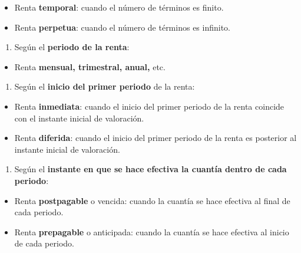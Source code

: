 \documentclass[
  letterpaper,
  DIV=11,
  numbers=noendperiod]{scrartcl}
\providecommand{\tightlist}{%
  \setlength{\itemsep}{0pt}\setlength{\parskip}{0pt}}\usepackage{longtable,booktabs,array}
\begin{document}
\begin{itemize}
\tightlist
\item
  Renta \textbf{temporal}: cuando el número de términos es finito.
\item
  Renta \textbf{perpetua}: cuando el número de términos es infinito.
\end{itemize}

\begin{enumerate}
\def\labelenumi{\arabic{enumi}.}
\setcounter{enumi}{2}
\tightlist
\item
  Según el \textbf{periodo de la renta}:
\end{enumerate}

\begin{itemize}
\tightlist
\item
  Renta \textbf{mensual, trimestral, anual,} etc.
\end{itemize}

\begin{enumerate}
\def\labelenumi{\arabic{enumi}.}
\setcounter{enumi}{3}
\tightlist
\item
  Según el \textbf{inicio del primer periodo} de la renta:
\end{enumerate}

\begin{itemize}
\tightlist
\item
  Renta \textbf{inmediata}: cuando el inicio del primer periodo de la
  renta coincide con el instante inicial de valoración.
\item
  Renta \textbf{diferida}: cuando el inicio del primer periodo de la
  renta es posterior al instante inicial de valoración.
\end{itemize}

\begin{enumerate}
\def\labelenumi{\arabic{enumi}.}
\setcounter{enumi}{4}
\tightlist
\item
  Según el \textbf{instante en que se hace efectiva la cuantía dentro de
  cada periodo}:
\end{enumerate}

\begin{itemize}
\tightlist
\item
  Renta \textbf{postpagable} o vencida: cuando la cuantía se hace
  efectiva al final de cada periodo.
\item
  Renta \textbf{prepagable} o anticipada: cuando la cuantía se hace
  efectiva al inicio de cada periodo.
\end{itemize}
\end{document}
